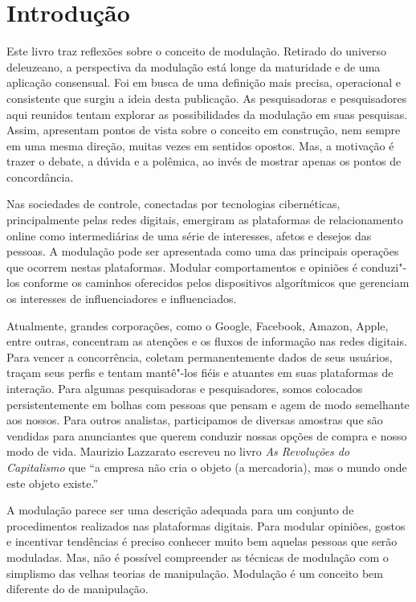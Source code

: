 \chapter*{Introdução}


Este livro traz reflexões sobre o conceito de modulação. Retirado do
universo deleuzeano, a perspectiva da modulação está longe da maturidade
e de uma aplicação consensual. Foi em busca de uma definição mais
precisa, operacional e consistente que surgiu a ideia desta publicação.
As pesquisadoras e pesquisadores aqui reunidos tentam explorar as
possibilidades da modulação em suas pesquisas. Assim, apresentam pontos
de vista sobre o conceito em construção, nem sempre em uma mesma
direção, muitas vezes em sentidos opostos. Mas, a motivação é trazer o
debate, a dúvida e a polêmica, ao invés de mostrar apenas os pontos de
concordância.

Nas sociedades de controle, conectadas por tecnologias cibernéticas,
principalmente pelas redes digitais, emergiram as plataformas de
relacionamento online como intermediárias de uma série de interesses,
afetos e desejos das pessoas. A modulação pode ser apresentada como uma
das principais operações que ocorrem nestas plataformas. Modular
comportamentos e opiniões é conduzi"-los conforme os caminhos oferecidos
pelos dispositivos algorítmicos que gerenciam os interesses de
influenciadores e influenciados.

Atualmente, grandes corporações, como o Google, Facebook, Amazon,
Apple, entre outras, concentram as atenções e os fluxos de informação
nas redes digitais. Para vencer a concorrência, coletam permanentemente
dados de seus usuários, traçam seus perfis e tentam mantê"-los fiéis e
atuantes em suas plataformas de interação. Para algumas pesquisadoras e pesquisadores,
somos colocados persistentemente em bolhas com pessoas que
pensam e agem de modo semelhante aos nossos. Para outros analistas, participamos de
diversas amostras que são vendidas para anunciantes que querem conduzir
nossas opções de compra e nosso modo de vida. Maurizio Lazzarato
escreveu no livro \emph{As Revoluções do Capitalismo} que ``a
empresa não cria o objeto (a mercadoria), mas o mundo onde este objeto existe.''

A modulação parece ser uma descrição adequada para um conjunto de
procedimentos realizados nas plataformas digitais. Para modular
opiniões, gostos e incentivar tendências é preciso conhecer muito bem
aquelas pessoas que serão moduladas. Mas, não é possível compreender as
técnicas de modulação com o simplismo das velhas teorias de manipulação.
Modulação é um conceito bem diferente do de manipulação.

